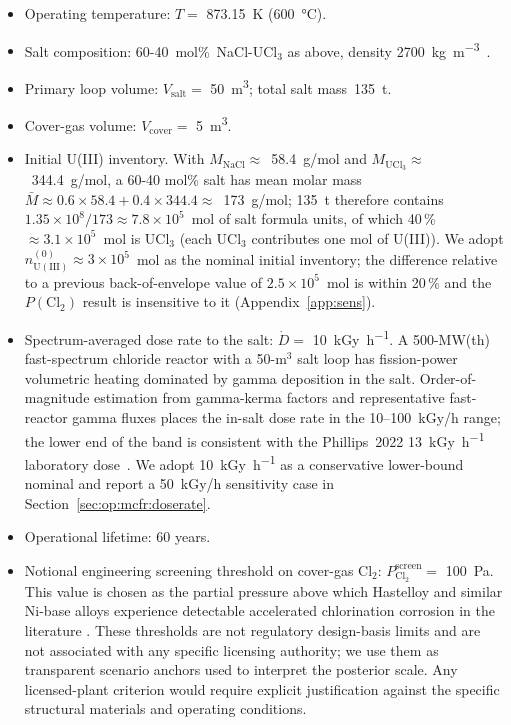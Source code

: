 \documentclass[11pt]{article}
\theoremstyle{plain}
\theoremstyle{definition}
\theoremstyle{remark}
\begin{document}
\begin{itemize}
\item Operating temperature: $T = $ \SI{873.15}{\kelvin} (\SI{600}{\celsius}).
\item Salt composition: 60-40~mol\%~NaCl-UCl$_3$ as above, density
      \SI{2700}{\kilogram\per\meter\cubed}~\citep{Janz1988,Sohal2010}.
\item Primary loop volume: $V_{\mathrm{salt}} = $ \SI{50}{\meter\cubed}; total
      salt mass~\SI{135}{\tonne}.
\item Cover-gas volume: $V_{\mathrm{cover}} = $ \SI{5}{\meter\cubed}.
\item Initial U(III) inventory.  With $M_{\mathrm{NaCl}} \approx$~58.4~g/mol
      and $M_{\mathrm{UCl_3}} \approx$~344.4~g/mol, a 60-40 mol\% salt has
      mean molar mass $\bar{M}\approx0.6\!\times\!58.4 + 0.4\!\times\!344.4
      \approx$~173~g/mol; 135~t therefore contains $1.35\!\times\!10^8 /
      173 \approx 7.8\!\times\!10^5$~mol of salt formula units, of which
      40\,\%~$\approx 3.1\!\times\!10^5$~mol is UCl$_3$ (each UCl$_3$
      contributes one mol of U(III)).  We adopt
      $n_{\mathrm{U(III)}}^{(0)} \approx 3\!\times\!10^5$~mol as the
      nominal initial inventory; the difference relative to a previous
      back-of-envelope value of $2.5\!\times\!10^5$~mol is within 20\,\%
      and the $P(\mathrm{Cl}_2)$ result is insensitive to it
      (Appendix~\ref{app:sens}).
\item Spectrum-averaged dose rate to the salt:
      $\dot{D} = $ \SI{10}{\kilo\gray\per\hour}.  A 500-MW(th)
      fast-spectrum chloride reactor with a 50-m$^3$ salt loop has
      fission-power volumetric heating dominated by gamma deposition in
      the salt.  Order-of-magnitude estimation from gamma-kerma factors
      and representative fast-reactor gamma fluxes places the in-salt
      dose rate in the 10--100~kGy/h range; the lower end of the band is
      consistent with the Phillips~2022 \SI{13}{\kilo\gray\per\hour}
      laboratory dose~\citep{Phillips2022,Sohal2010}.  We adopt
      \SI{10}{\kilo\gray\per\hour} as a conservative lower-bound nominal
      and report a 50~kGy/h sensitivity case in
      Section~\ref{sec:op:mcfr:doserate}.
\item Operational lifetime: 60 years.
\item Notional engineering screening threshold on cover-gas Cl$_2$:
      $P_{\mathrm{Cl_2}}^{\mathrm{screen}} = $
      \SI{100}{\pascal}.  This value is chosen as the partial pressure
      above which Hastelloy and similar Ni-base alloys experience
      detectable accelerated chlorination corrosion in the literature
      \citep{Sohal2010,Carotti2017,Forsberg2020}.  These thresholds
      are not regulatory design-basis limits and are not associated with
      any specific licensing authority; we use them as transparent
      scenario anchors used to interpret the posterior scale.  Any
      licensed-plant criterion would require explicit justification
      against the specific structural materials and operating conditions.
\end{itemize}
\end{document}
